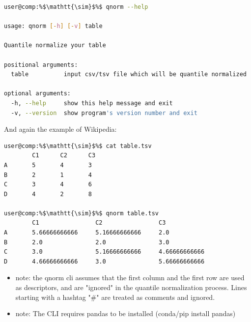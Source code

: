 \begin{mdframed}[
    backgroundcolor=bash_backcolor,
    hidealllines=true,
    innertopmargin=0pt,
    innerbottommargin=0pt,
    innerleftmargin=0pt,
    innerrightmargin=0pt
]
\begin{lstlisting}[escapechar=\%,language=bash,basicstyle=\ttfamily\linespread{1.15}\footnotesize\color{white}]
user@comp:%$\mathtt{\sim}$%$ qnorm --help

usage: qnorm [-h] [-v] table

Quantile normalize your table

positional arguments:
  table          input csv/tsv file which will be quantile normalized

optional arguments:
  -h, --help     show this help message and exit
  -v, --version  show program's version number and exit
\end{lstlisting}
\end{mdframed}

And again the example of Wikipedia:

\begin{mdframed}[
    backgroundcolor=bash_backcolor,
    hidealllines=true,
    innertopmargin=0pt,
    innerbottommargin=0pt,
    innerleftmargin=0pt,
    innerrightmargin=0pt
]
\begin{lstlisting}[escapechar=\%,language=bash,basicstyle=\ttfamily\linespread{1.15}\footnotesize\color{white}]
user@comp:%$\mathtt{\sim}$%$ cat table.tsv
        C1      C2      C3
A       5       4       3
B       2       1       4
C       3       4       6
D       4       2       8

user@comp:%$\mathtt{\sim}$%$ qnorm table.tsv
        C1                C2                C3
A       5.66666666666     5.16666666666     2.0
B       2.0               2.0               3.0
C       3.0               5.16666666666     4.66666666666
D       4.66666666666     3.0               5.66666666666
\end{lstlisting}
\end{mdframed}

\begin{itemize}
    \item note: the qnorm cli assumes that the first column and the first row are used as descriptors, and are "ignored" in the quantile normalization process. Lines starting with a hashtag "\#" are treated as comments and ignored.

    \item note: The CLI requires pandas to be installed (conda/pip install pandas)
\end{itemize}

